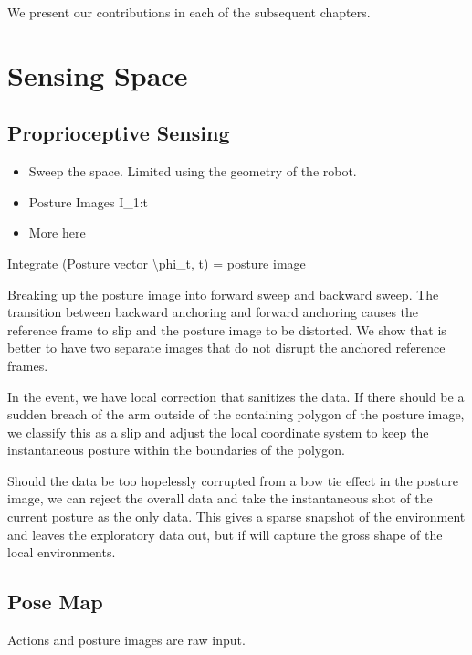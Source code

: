 We present our contributions in each of the subsequent chapters.

\pagebreak 

\chapter{Sensing Space}
\label{chap:sensing}

\section{Proprioceptive Sensing}
\label{proprioceptivesensing}

\begin{itemize}
\item Sweep the space. Limited using the geometry of the robot.

\item Posture Images I\_1:t

\item More here

\end{itemize}

Integrate (Posture vector \textbackslash{}phi\_t, t) = posture image

Breaking up the posture image into forward sweep and backward sweep. The transition between backward anchoring and forward anchoring causes the reference frame to slip and the posture image to be distorted. We show that is better to have two separate images that do not disrupt the anchored reference frames.

In the event, we have local correction that sanitizes the data. If there should be a sudden breach of the arm outside of the containing polygon of the posture image, we classify this as a slip and adjust the local coordinate system to keep the instantaneous posture within the boundaries of the polygon.

Should the data be too hopelessly corrupted from a bow tie effect in the posture image, we can reject the overall data and take the instantaneous shot of the current posture as the only data. This gives a sparse snapshot of the environment and leaves the exploratory data out, but if will capture the gross shape of the local environments.

\section{Pose Map}
\label{posemap}

Actions and posture images are raw input.


